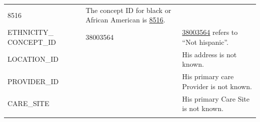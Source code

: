 \documentclass[10.5pt]{book}
\theoremstyle{definition}
\theoremstyle{definition}
\theoremstyle{definition}
\theoremstyle{remark}
\begin{document}
\begin{longtable}[]{@{}lll@{}}
\begin{minipage}[t]{0.16\columnwidth}
8516\strut
\end{minipage} & \begin{minipage}[t]{0.48\columnwidth}\raggedright\strut
The concept ID for black or African American is
\href{http://athena.ohdsi.org/search-terms/terms/8516}{8516}.\strut
\end{minipage}\tabularnewline
\begin{minipage}[t]{0.28\columnwidth}\raggedright\strut
ETHNICITY\_ CONCEPT\_ID\strut
\end{minipage} & \begin{minipage}[t]{0.16\columnwidth}\raggedright\strut
38003564\strut
\end{minipage} & \begin{minipage}[t]{0.48\columnwidth}\raggedright\strut
\href{http://athena.ohdsi.org/search-terms/terms/38003564}{38003564}
refers to ``Not hispanic''.\strut
\end{minipage}\tabularnewline
\begin{minipage}[t]{0.28\columnwidth}\raggedright\strut
LOCATION\_ID\strut
\end{minipage} & \begin{minipage}[t]{0.16\columnwidth}\raggedright\strut
\strut
\end{minipage} & \begin{minipage}[t]{0.48\columnwidth}\raggedright\strut
His address is not known.\strut
\end{minipage}\tabularnewline
\begin{minipage}[t]{0.28\columnwidth}\raggedright\strut
PROVIDER\_ID\strut
\end{minipage} & \begin{minipage}[t]{0.16\columnwidth}\raggedright\strut
\strut
\end{minipage} & \begin{minipage}[t]{0.48\columnwidth}\raggedright\strut
His primary care Provider is not known.\strut
\end{minipage}\tabularnewline
\begin{minipage}[t]{0.28\columnwidth}\raggedright\strut
CARE\_SITE\strut
\end{minipage} & \begin{minipage}[t]{0.16\columnwidth}\raggedright\strut
\strut
\end{minipage} & \begin{minipage}[t]{0.48\columnwidth}\raggedright\strut
His primary Care Site is not known.\strut
\end{minipage}\tabularnewline
\begin{minipage}[t]{0.28\columnwidth}\raggedright\strut

\end{minipage}
\end{longtable}
\end{document}

